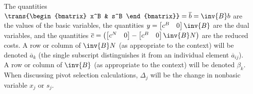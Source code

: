The quantities
$\trans{\begin{bmatrix} x^B & s^B \end{bmatrix}} =
\overline{b} = \inv{B}b$ are the values of the basic
variables, the quantities
$y = \begin{bmatrix} c^B & 0 \end{bmatrix}\inv{B}$ are the dual
variables, and the quantities
$\overline{c} = \left(
		  \begin{bmatrix} c^N & 0 \end{bmatrix} -
		  \begin{bmatrix} c^B & 0 \end{bmatrix} \inv{B} N
		\right)$
are the reduced costs.
A row or column of $\inv{B}N$ (as appropriate to the context) will be
denoted $\overline{a}_k$ (the single subscript distinguishes it from an
individual element $\overline{a}_{ij}$).
A row or column of $\inv{B}$ (as appropriate to the context) will be
denoted $\beta_k$.
When discussing pivot selection calculations, $\Delta_j$ will be the
change in nonbasic variable $x_j$ or $s_j$.

